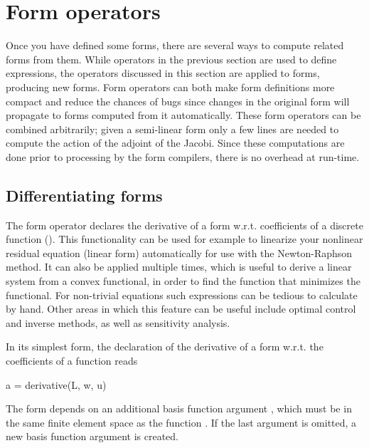 \section{Form operators}
\label{ufl:sec:formtransformations}

Once you have defined some forms, there are several ways to compute
related forms from them.  While operators in the previous section are
used to define expressions, the operators discussed in this section are
applied to forms, producing new forms.  Form operators can both make form
definitions more compact and reduce the chances of bugs since changes in
the original form will propagate to forms computed from it automatically.
These form operators can be combined arbitrarily; given a semi-linear
form only a few lines are needed to compute the action of the adjoint
of the Jacobi.  Since these computations are done prior to processing
by the form compilers, there is no overhead at run-time.

\subsection{Differentiating forms}
\label{ufl:sec:derivative}

The form operator  declares the derivative of a form
w.r.t. coefficients of a discrete function ().  This
functionality can be used for example to linearize your nonlinear residual
equation (linear form) automatically for use with the Newton-Raphson
method.  It can also be applied multiple times, which is useful to
derive a linear system from a convex functional, in order to find the
function that minimizes the functional.  For non-trivial equations such
expressions can be tedious to calculate by hand.  Other areas in which
this feature can be useful include optimal control and inverse methods,
as well as sensitivity analysis.

In its simplest form, the declaration of the derivative of a form 
w.r.t. the coefficients of a function  reads
\begin{python}
a = derivative(L, w, u)
\end{python}
The form  depends on an additional basis function argument ,
which must be in the same finite element space as the function .
If the last argument is omitted, a new basis function argument is created.


